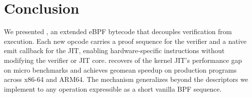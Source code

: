 


\section{Conclusion}
\label{sec:conclusion}

We presented \lang, an extended eBPF bytecode that decouples verification from execution. Each new opcode carries a proof sequence for the verifier and a native emit callback for the JIT, enabling hardware-specific instructions without modifying the verifier or JIT core. 
\lang recovers  of the kernel JIT's performance gap on  micro benchmarks and achieves  geomean speedup on  production programs across x86-64 and ARM64. The mechanism generalizes beyond the  descriptors we implement to any operation expressible as a short vanilla BPF sequence.